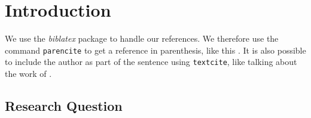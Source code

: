 \chapter{Introduction}

We use the \emph{biblatex} package to handle our references.  We therefore use the
command \texttt{parencite} to get a reference in parenthesis, like this
\parencite{heisenberg2015}.  It is also possible to include the author
as part of the sentence using \texttt{textcite}, like talking about
the work of \textcite{einstein2016}.

\Blindtext

\section{Research Question}

\blindtext
